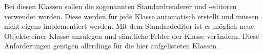 Bei diesen Klassen sollen die sogenannten Standardrenderer und -editoren verwendet werden. Diese werden für jede Klasse automatisch erstellt und müssen nicht eigens implementiert werden.
Mit dem Standardeditor ist es möglich neue Objekte einer Klasse anzulegen und sämtliche Felder der Klasse verändern.
Diese Anforderungen genügen allerdings für die hier aufgelisteten Klassen.


